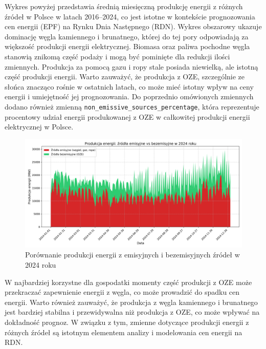 Wykres powyżej przedstawia średnią miesięczną produkcję energii z różnych źródeł w Polsce w latach 2016–2024, co jest istotne w kontekście prognozowania cen energii (EPF) na Rynku Dnia Następnego (RDN). Wykres obszarowy ukazuje dominację węgla kamiennego i brunatnego, której do tej pory odpowiadają za większość produkcji energii elektrycznej. Biomasa oraz paliwa pochodne węgla stanowią znikomą część podaży i mogą być pominięte dla redukcji ilości zmiennych. Produkcja za pomocą gazu i ropy stale posiada niewielką, ale istotną część produkcji energii. Warto zauważyć, że produkcja z OZE, szczególnie ze słońca znacząco rośnie w ostatnich latach, co może mieć istotny wpływ na ceny energii i umiejętność jej prognozowania. Do poprzednio omówionych zmiennych dodano również zmienną \texttt{non\_emissive\_sources\_percentage}, która reprezentuje procentowy udział energii produkowanej z OZE w całkowitej produkcji energii elektrycznej w Polsce.
\begin{figure}[H]
    \centering
    \includegraphics[width=\textwidth]{../plots/energy/emission_vs_non_emission_2024.png}
    \caption{Porównanie produkcji energii z emisyjnych i bezemisyjnych źródeł w 2024 roku}
    \label{fig:emission-vs-non-emission-2024}
\end{figure}
W najbardziej korzystne dla gospodatki momenty część produkcji z OZE może przekraczać zapewnienie energii z węgla, co może prowadzić do spadku cen energii. Warto również zauważyć, że produkcja z węgla kamiennego i brunatnego jest bardziej stabilna i przewidywalna niż produkcja z OZE, co może wpływać na dokładność prognoz. W związku z tym, zmienne dotyczące produkcji energii z różnych źródeł są istotnym elementem analizy i modelowania cen energii na RDN.

